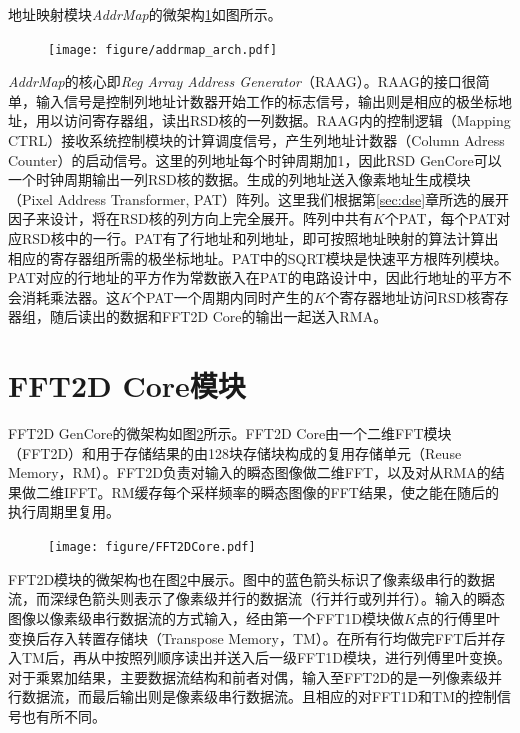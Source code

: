 \documentclass[master]{shtthesis}             %
\begin{document}
地址映射模块\textit{AddrMap}的微架构\ref{fig:addrmap_arch}如图所示。
\begin{figure}[!tb]
  \centering
  \texttt{[image: figure/addrmap\_arch.pdf]}
  \label{fig:addrmap_arch}
\end{figure}
\textit{AddrMap}的核心即\textit{Reg Array Address Generator}（RAAG）。RAAG的接口很简单，输入信号是控制列地址计数器开始工作的标志信号，输出则是相应的极坐标地址，用以访问寄存器组，读出RSD核的一列数据。RAAG内的控制逻辑（Mapping CTRL）接收系统控制模块的计算调度信号，产生列地址计数器（Column Adress Counter）的启动信号。这里的列地址每个时钟周期加1，因此RSD GenCore可以一个时钟周期输出一列RSD核的数据。生成的列地址送入像素地址生成模块（Pixel Address Transformer, PAT）阵列。这里我们根据第\ref{sec:dse}章所选的展开因子来设计，将在RSD核的列方向上完全展开。阵列中共有$K$个PAT，每个PAT对应RSD核中的一行。PAT有了行地址和列地址，即可按照地址映射的算法计算出相应的寄存器组所需的极坐标地址。PAT中的SQRT模块是快速平方根阵列模块。PAT对应的行地址的平方作为常数嵌入在PAT的电路设计中，因此行地址的平方不会消耗乘法器。这$K$个PAT一个周期内同时产生的$K$个寄存器地址访问RSD核寄存器组，随后读出的数据和FFT2D Core的输出一起送入RMA。

\section{FFT2D Core模块}

FFT2D GenCore的微架构如图\ref{fig:fft2d_core_uarch}所示。FFT2D Core由一个二维FFT模块（FFT2D）和用于存储结果的由128块存储块构成的复用存储单元（Reuse Memory，RM）。FFT2D负责对输入的瞬态图像做二维FFT，以及对从RMA的结果做二维IFFT。RM缓存每个采样频率的瞬态图像的FFT结果，使之能在随后的执行周期里复用。%
\begin{figure}[!tb]
  \centering
  \texttt{[image: figure/FFT2DCore.pdf]}
  \label{fig:fft2d_core_uarch}
\end{figure}
FFT2D模块的微架构也在图\ref{fig:fft2d_core_uarch}中展示。图中的蓝色箭头标识了像素级串行的数据流，而深绿色箭头则表示了像素级并行的数据流（行并行或列并行）。输入的瞬态图像以像素级串行数据流的方式输入，经由第一个FFT1D模块做$K$点的行傅里叶变换后存入转置存储块（Transpose Memory，TM）。在所有行均做完FFT后并存入TM后，再从中按照列顺序读出并送入后一级FFT1D模块，进行列傅里叶变换。对于乘累加结果，主要数据流结构和前者对偶，输入至FFT2D的是一列像素级并行数据流，而最后输出则是像素级串行数据流。且相应的对FFT1D和TM的控制信号也有所不同。
\end{document}
